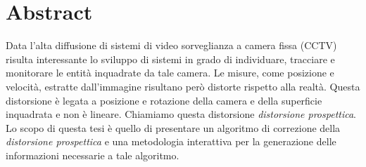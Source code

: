 \chapter*{Abstract}
Data l'alta diffusione di sistemi di video sorveglianza a camera fissa (CCTV) risulta interessante lo sviluppo di sistemi in grado di individuare, tracciare e monitorare le entità inquadrate da tale camera.
Le misure, come posizione e velocità, estratte dall'immagine risultano però distorte rispetto alla realtà. Questa distorsione è legata a posizione e rotazione della camera e della superficie inquadrata e non è lineare.
Chiamiamo questa distorsione \emph{distorsione prospettica}.
Lo scopo di questa tesi è quello di presentare un algoritmo di correzione della \emph{distorsione prospettica} e una metodologia interattiva per la generazione delle informazioni necessarie a tale algoritmo.
